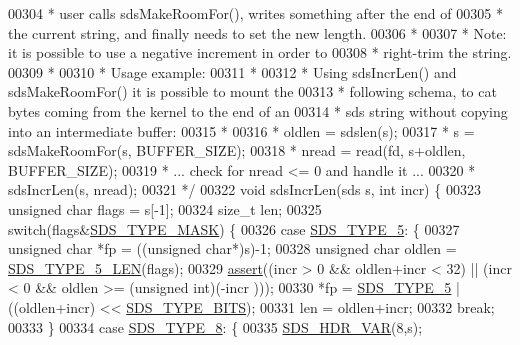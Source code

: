 \begin{DoxyCode}
{00304 \textcolor{comment}{ * user calls sdsMakeRoomFor(), writes something after the end of}
00305 \textcolor{comment}{ * the current string, and finally needs to set the new length.}
00306 \textcolor{comment}{ *}
00307 \textcolor{comment}{ * Note: it is possible to use a negative increment in order to}
00308 \textcolor{comment}{ * right-trim the string.}
00309 \textcolor{comment}{ *}
00310 \textcolor{comment}{ * Usage example:}
00311 \textcolor{comment}{ *}
00312 \textcolor{comment}{ * Using sdsIncrLen() and sdsMakeRoomFor() it is possible to mount the}
00313 \textcolor{comment}{ * following schema, to cat bytes coming from the kernel to the end of an}
00314 \textcolor{comment}{ * sds string without copying into an intermediate buffer:}
00315 \textcolor{comment}{ *}
00316 \textcolor{comment}{ * oldlen = sdslen(s);}
00317 \textcolor{comment}{ * s = sdsMakeRoomFor(s, BUFFER\_SIZE);}
00318 \textcolor{comment}{ * nread = read(fd, s+oldlen, BUFFER\_SIZE);}
00319 \textcolor{comment}{ * ... check for nread <= 0 and handle it ...}
00320 \textcolor{comment}{ * sdsIncrLen(s, nread);}
00321 \textcolor{comment}{ */}
00322 \textcolor{keywordtype}{void} sdsIncrLen(sds s, \textcolor{keywordtype}{int} incr) \{
00323     \textcolor{keywordtype}{unsigned} \textcolor{keywordtype}{char} flags = s[-1];
00324     size\_t len;
00325     \textcolor{keywordflow}{switch}(flags&\hyperlink{sds_8h_a07564783f389fdd7772a8f61d55d9ddf}{SDS\_TYPE\_MASK}) \{
00326         \textcolor{keywordflow}{case} \hyperlink{sds_8h_a3b7b67f1efa75f6b78ae18ea853b1a91}{SDS\_TYPE\_5}: \{
00327             \textcolor{keywordtype}{unsigned} \textcolor{keywordtype}{char} *fp = ((\textcolor{keywordtype}{unsigned} \textcolor{keywordtype}{char}*)s)-1;
00328             \textcolor{keywordtype}{unsigned} \textcolor{keywordtype}{char} oldlen = \hyperlink{sds_8h_a387aebc42becc7d798cd1a33533da2de}{SDS\_TYPE\_5\_LEN}(flags);
00329             \hyperlink{redisassert_8h_a993abaa2c168852c1592879472938781}{assert}((incr > 0 && oldlen+incr < 32) || (incr < 0 && oldlen >= (\textcolor{keywordtype}{unsigned} \textcolor{keywordtype}{int})(-incr
      )));
00330             *fp = \hyperlink{sds_8h_a3b7b67f1efa75f6b78ae18ea853b1a91}{SDS\_TYPE\_5} | ((oldlen+incr) << \hyperlink{sds_8h_aab3be62faa5a2354242a1c1036450a40}{SDS\_TYPE\_BITS});
00331             len = oldlen+incr;
00332             \textcolor{keywordflow}{break};
00333         \}
00334         \textcolor{keywordflow}{case} \hyperlink{sds_8h_a504136356f04bfa2fd616dd4c8fdd71c}{SDS\_TYPE\_8}: \{
00335             \hyperlink{sds_8h_a79b76920d1d9bc010926b7af167de89b}{SDS\_HDR\_VAR}(8,s);
}
\end{DoxyCode}
